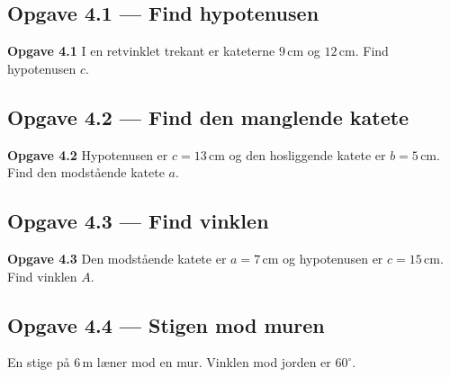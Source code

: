 \documentclass[11pt,a4paper]{article}
\begin{document}
\subsection*{Opgave 4.1 --- Find hypotenusen}

\begin{opgavebox}
\textbf{Opgave 4.1} \quad I en retvinklet trekant er kateterne $9\,\text{cm}$
og $12\,\text{cm}$. Find hypotenusen $c$.
\end{opgavebox}

\subsection*{Opgave 4.2 --- Find den manglende katete}

\begin{opgavebox}
\textbf{Opgave 4.2} \quad Hypotenusen er $c = 13\,\text{cm}$ og den hosliggende
katete er $b = 5\,\text{cm}$. Find den modstående katete $a$.
\end{opgavebox}

\subsection*{Opgave 4.3 --- Find vinklen}

\begin{opgavebox}
\textbf{Opgave 4.3} \quad Den modstående katete er $a = 7\,\text{cm}$ og
hypotenusen er $c = 15\,\text{cm}$. Find vinklen $A$.
\end{opgavebox}

\subsection*{Opgave 4.4 --- Stigen mod muren}

\noindent
En stige på $6\,\text{m}$ læner mod en mur. Vinklen mod jorden er $60^{\circ}$.

\begin{center}
\end{center}
\end{document}
